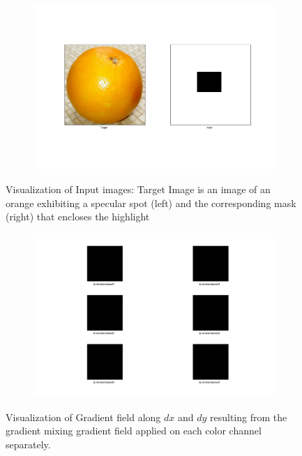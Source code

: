 \documentclass{paper}
\begin{document}
\begin{figure}[H]
    \centering
    \begin{subfigure}{1.0\textwidth}
        \includegraphics[width=\textwidth]{../../outputs/p4/highlight_removal/input}
    \end{subfigure}
    \caption{Visualization of Input images: Target Image is an image of an orange exhibiting a specular spot (left) and the corresponding mask (right) that encloses the highlight}
    \label{fig:highlight_removal_input}       
\end{figure}


\begin{figure}[H]
    \centering
    \begin{subfigure}{1.0\textwidth}
        \includegraphics[width=\textwidth]{../../outputs/p4/highlight_removal/gradients4colorchannels}
    \end{subfigure}
    \caption{Visualization of Gradient field along $dx$ and $dy$ resulting from the gradient mixing gradient field applied on each color channel separately.}
    \label{fig:highlight_removal_gradients}       
\end{figure}
\end{document}
